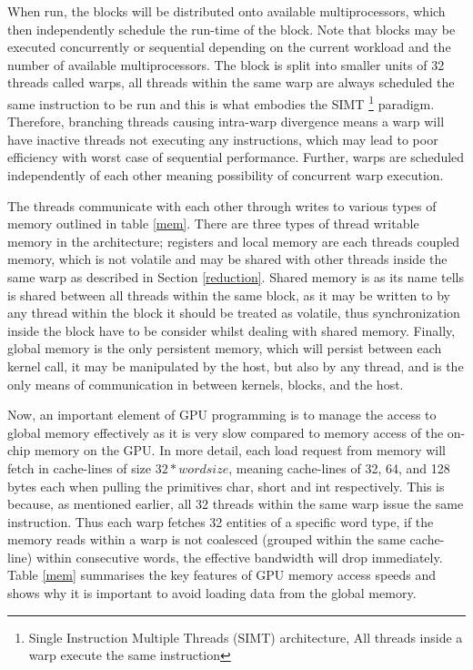 \documentclass[a4paper, 12pt]{report}
\begin{document}
When run, the blocks will be distributed onto available multiprocessors, which then independently schedule the run-time of the block. 
Note that blocks may be executed concurrently or sequential depending on the current workload and the number of available multiprocessors. 
The block is split into smaller units of 32 threads called warps, all threads within the same warp are always scheduled the same instruction 
to be run and this is what embodies the SIMT \footnote{Single Instruction Multiple Threads (SIMT) architecture, All threads inside a warp execute the same instruction} paradigm. 
Therefore, branching threads causing intra-warp divergence means a warp will have inactive threads not executing any instructions,  which may lead to poor efficiency with worst case of sequential performance. 
Further, warps are scheduled independently of each other meaning possibility of concurrent warp execution.

The threads communicate with each other through writes to various types of memory outlined in table \ref{mem}. 
There are three types of thread writable memory in the architecture; registers and local memory are each threads coupled memory, 
which is not volatile and may be shared with other threads inside the same warp as described in Section \ref{reduction}. 
Shared memory is as its name tells is shared between all threads within the same block, as it may be written to by any thread 
within the block it should be treated as volatile, thus synchronization inside the block have to be consider whilst dealing with shared memory.
Finally, global memory is the only persistent memory, which will persist between each kernel call, it may be manipulated by the host, 
but also by any thread, and is the only means of communication in between kernels, blocks, and the host.

Now, an important element of GPU programming is to manage the access to global memory effectively as it is very slow compared to memory access 
of the on-chip memory on the GPU. In more detail, each load request from memory will fetch in cache-lines of size $32*wordsize$, meaning 
cache-lines of 32, 64, and 128 bytes each when pulling the primitives char, short and int respectively. 
This is because, as mentioned earlier, all 32 threads within the same warp issue the same instruction. 
Thus each warp fetches 32 entities of a specific word type, if the memory reads within a warp is not coalesced (grouped within the same cache-line)
within consecutive words, the effective bandwidth will drop immediately. 
Table \ref{mem} summarises the key features of GPU memory access speeds and shows why it is important to avoid loading data from the global memory.
\end{document}
